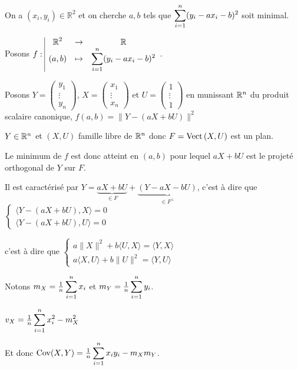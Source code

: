 \begin{exemple}
    On a $(x_i, y_i) \in \mathbb R^2$ et on cherche $a, b$ tels que 
    $\displaystyle \sum_{i = 1}^n (y_i - ax_i - b)^2$ soit minimal.

    Posons $f: \space \begin{array}{|ccc} \displaystyle \mathbb{R}^2 & \to & \displaystyle \mathbb{R} \\ \displaystyle (a, b) & \mapsto & \displaystyle \displaystyle \sum_{i = 1}^n (y_i - ax_i - b)^2 \end{array}$.

    Posons $Y = \begin{pmatrix}
y_1 \\
\vdots \\
y_n
\end{pmatrix}$, $X = \begin{pmatrix}
    x_1 \\
    \vdots \\
    x_n
    \end{pmatrix}$ et $U = \begin{pmatrix}
    1 \\
    \vdots \\
    1
    \end{pmatrix}$ en munissant $\mathbb{R}^n$ du produit scalaire canonique, 
    $f(a, b) = \| Y - (a X + bU) \|^2$ 

    $Y \in \mathbb{R}^n$ et $(X, U)$ famille libre de $\mathbb{R}^n$ donc $F = \operatorname{Vect} \,(X, U)$ est un plan. 

    Le minimum de $f$ est donc atteint en $(a, b)$ pour lequel $aX + bU$ est le projeté
    orthogonal de $Y$ sur $F$. 

    Il est caractérisé par $Y = \underbrace{aX + bU}_{\in F} + \underbrace{(Y - aX - bU)}_{\in F^\perp}$, 
    c'est à dire que 
    $\begin{cases}
        \langle Y - (aX + bU), X \rangle = 0 \\
        \langle Y - (aX + bU), U \rangle = 0
    \end{cases}$
    
    c'est à dire que $\begin{cases}
        a \|X\|^2 + b \langle U, X \rangle = \langle Y, X \rangle \\
        a \langle X, U \rangle + b \|U\|^2 = \langle Y, U \rangle
    \end{cases}$

    Notons $m_X = \frac 1 n \displaystyle \sum_{i = 1}^n x_i$ et $m_Y = \frac 1 n \displaystyle \sum_{i = 1}^n y_i$.

    $v_X = \frac 1 n \displaystyle \sum_{i = 1 }^{n } x_i^2 - m_X^2$

    Et donc $\operatorname{Cov} (X, Y) = \frac 1 n \displaystyle \sum_{i = 1}^n x_i y_i - m_X m_Y$.


\end{exemple}
